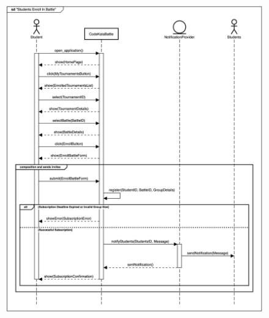 \documentclass{Configuration_Files/Template}
\begin{document}
\begin{figure}[H]
\includegraphics[scale = 0.45]{Images/SequenceDiagrams/StudentEnrollsInBattleSeqDiagram.png}\\
\centering
\end{figure}
\end{document}
